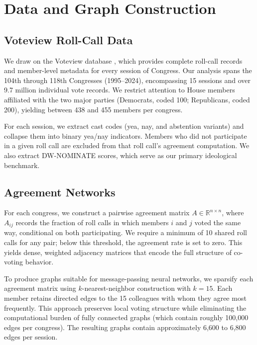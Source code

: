 \documentclass[11pt]{article}
\begin{document}
\section{Data and Graph Construction}

\subsection{Voteview Roll-Call Data}

We draw on the Voteview database \citep{lewis2023voteview}, which provides complete roll-call records and member-level metadata for every session of Congress. Our analysis spans the 104th through 118th Congresses (1995--2024), encompassing 15 sessions and over 9.7 million individual vote records. We restrict attention to House members affiliated with the two major parties (Democrats, coded 100; Republicans, coded 200), yielding between 438 and 455 members per congress.

For each session, we extract cast codes (yea, nay, and abstention variants) and collapse them into binary yea/nay indicators. Members who did not participate in a given roll call are excluded from that roll call's agreement computation. We also extract DW-NOMINATE scores, which serve as our primary ideological benchmark.

\subsection{Agreement Networks}

For each congress, we construct a pairwise agreement matrix $A \in \mathbb{R}^{n \times n}$, where $A_{ij}$ records the fraction of roll calls in which members $i$ and $j$ voted the same way, conditional on both participating. We require a minimum of 10 shared roll calls for any pair; below this threshold, the agreement rate is set to zero. This yields dense, weighted adjacency matrices that encode the full structure of co-voting behavior.

To produce graphs suitable for message-passing neural networks, we sparsify each agreement matrix using $k$-nearest-neighbor construction with $k=15$. Each member retains directed edges to the 15 colleagues with whom they agree most frequently. This approach preserves local voting structure while eliminating the computational burden of fully connected graphs (which contain roughly 100,000 edges per congress). The resulting graphs contain approximately 6,600 to 6,800 edges per session.
\end{document}
